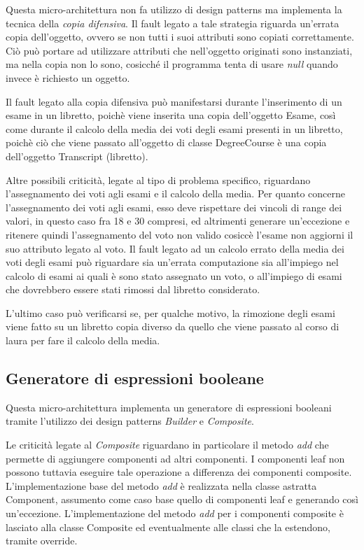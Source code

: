 Questa micro-architettura non fa utilizzo di design patterns ma implementa la tecnica della \emph{copia difensiva}. Il fault legato a tale strategia riguarda un'errata copia dell'oggetto, ovvero se non tutti i suoi attributi sono copiati correttamente. Ciò può portare ad utilizzare attributi che nell'oggetto originati sono instanziati, ma nella copia non lo sono, cosicché il programma tenta di usare \emph{null} quando invece è richiesto un oggetto.

Il fault legato alla copia difensiva può manifestarsi durante l'inserimento di un esame in un libretto, poichè viene inserita una copia dell'oggetto Esame, così come durante il calcolo della media dei voti degli esami presenti in un libretto, poichè ciò che viene passato all'oggetto di classe DegreeCourse è una copia dell'oggetto Transcript (libretto).

Altre possibili criticità, legate al tipo di problema specifico, riguardano l'assegnamento dei voti agli esami e il calcolo della media.
Per quanto concerne l'assegnamento dei voti agli esami, esso deve rispettare dei vincoli di range dei valori, in questo caso fra 18 e 30 compresi, ed altrimenti generare un'eccezione e ritenere quindi l'assegnamento del voto non valido cosiccè l'esame non aggiorni il suo attributo legato al voto.
Il fault legato ad un calcolo errato della media dei voti degli esami può riguardare sia un'errata computazione sia all'impiego nel calcolo di esami ai quali è sono stato assegnato un voto, o all'impiego di esami che dovrebbero essere stati rimossi dal libretto considerato.

L'ultimo caso può verificarsi se, per qualche motivo, la rimozione degli esami viene fatto su un libretto copia diverso da quello che viene passato al corso di laura per fare il calcolo della media.


\subsection{Generatore di espressioni booleane}

Questa micro-architettura implementa un generatore di espressioni booleani tramite l'utilizzo dei design patterns \emph{Builder} e \emph{Composite}.

Le criticità legate al \emph{Composite} riguardano in particolare il metodo \textit{add} che permette di aggiungere componenti ad altri componenti. I componenti leaf non possono tuttavia eseguire tale operazione a differenza dei componenti composite. L'implementazione base del metodo \emph{add} è realizzata nella classe astratta Component, assumento come caso base quello di componenti leaf e generando così un'eccezione. L'implementazione del metodo \emph{add} per i componenti composite è lasciato alla classe Composite ed eventualmente alle classi che la estendono, tramite override.

